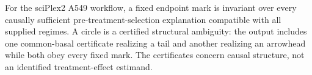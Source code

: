 For the sciPlex2 A549 workflow, a fixed endpoint mark is invariant over every causally sufficient pre-treatment-selection explanation compatible with all supplied regimes.  A circle is a certified structural ambiguity: the output includes one common-basal certificate realizing a tail and another realizing an arrowhead while both obey every fixed mark.  The certificates concern causal structure, not an identified treatment-effect estimand.